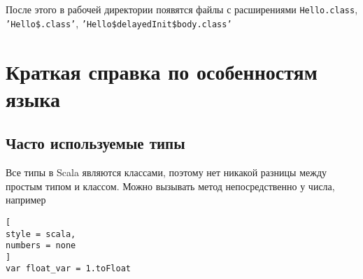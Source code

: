 \documentclass[%
	11pt,
	a4paper,
	utf8,
		]{article}
\begin{document}
После этого в рабочей директории появятся файлы с расширениями \texttt{Hello.class}, \texttt{'Hello\$.class'}, \texttt{'Hello\$delayedInit\$body.class'}

\section{Краткая справка по особенностям языка}

\subsection{Часто используемые типы}

Все типы в Scala являются классами, поэтому нет никакой разницы между простым типом и классом. Можно вызывать метод непосредственно у числа, например
\begin{lstlisting}[
style = scala,
numbers = none
]
var float_var = 1.toFloat
\end{lstlisting}
\end{document}
